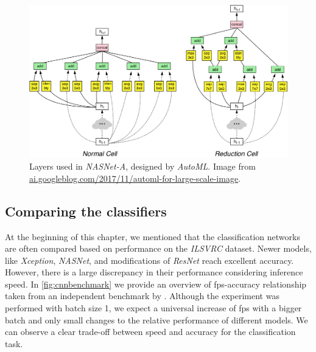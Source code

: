 \begin{figure}
    \includegraphics[width=\textwidth]{img/nasnet}
    \caption{Layers used in \textit{NASNet-A}, designed by \textit{AutoML}. Image from \url{ai.googleblog.com/2017/11/automl-for-large-scale-image}.}
    \label{fig:nasnet}
\end{figure}

\subsection{Comparing the classifiers}
At the beginning of this chapter, we mentioned that the classification networks are often compared based on performance on the \textit{ILSVRC} dataset. Newer models, like \textit{Xception}, \textit{NASNet}, and modifications of \textit{ResNet} reach excellent accuracy. However, there is a large discrepancy in their performance considering inference speed. In \cref{fig:cnnbenchmark} we provide an overview of fps-accuracy relationship taken from an independent benchmark by \citeauthor{bib:cnnbenchmark} \cite{bib:cnnbenchmark}. Although the experiment was performed with batch size 1, we expect a universal increase of fps with a bigger batch and only small changes to the relative performance of different models. We can observe a clear trade-off between speed and accuracy for the classification task.

